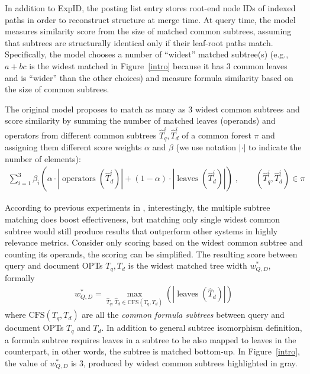 \documentclass[runningheads]{llncs}
\begin{document}
In addition to ExpID, the posting list entry stores root-end node IDs of indexed paths in order to reconstruct structure at merge time.
At query time, the model measures similarity score from the size of matched common subtrees, assuming that subtrees are structurally identical only if their leaf-root paths match.
%
Specifically, the model chooses a number of ``widest'' matched subtree(s) (e.g., $a+bc$ is the widest matched in Figure~\ref{intro} because it has 3 common leaves and is ``wider'' than the other choices) and measure formula similarity based on the size of common subtrees.

The original model proposes to match as many as 3 widest common subtrees and score similarity by summing the number of matched leaves (operands) and operators from different common subtrees $\hat{T}_q^i, \hat{T}_d^i$ of a common forest $\pi$ and assigning them different score weights $\alpha$ and $\beta$ (we use notation $|\cdot|$ to indicate the number of elements):
\begin{align}
\label{eq:1}
\sum^3_{i=1} \beta_i \left( \alpha \cdot \left|\operatorname{operators}(\hat{T}_d^i)\right| + (1 - \alpha) \cdot \left|\operatorname{leaves}(\hat{T}_d^i)\right| \right)\;, \qquad (\hat{T}_q^i, \hat{T}_d^i) \in \pi
\end{align}

%
According to previous experiments in \cite{a0_2019}, interestingly, the multiple subtree matching does boost effectiveness, but matching only single widest common subtree would still produce results that outperform other systems in highly relevance metrics.
%
Consider only scoring based on the widest common subtree and counting its operands, the scoring can be simplified. The resulting score between query and document OPTs $T_q, T_d$ is the widest matched tree width $w^*_{Q, D}$, formally
\begin{align}
\label{eq:2}
w^*_{Q, D} = \max_{\hat{T}_q, \hat{T}_d \in \text{CFS}(T_q,T_d)}(|\operatorname{leaves}(\hat{T}_d)|)
\end{align}
where
$\text{CFS}(T_q, T_d)$ are all the \textit{common formula subtrees} between query and document OPTs $T_q$ and $T_d$.
In addition to general subtree isomorphism definition, a formula subtree requires leaves in a subtree to be also mapped to leaves in the counterpart, in other words, the subtree is matched bottom-up.
%
In Figure~\ref{intro}, the value of $w^*_{Q, D}$ is 3, produced by widest common subtrees highlighted in gray.
\end{document}
